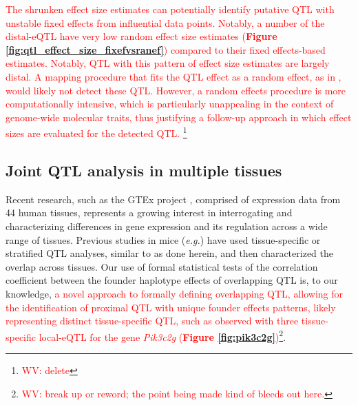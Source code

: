 \documentclass[9pt,twocolumn,twoside]{gsajnl}
\newcommand{\eg}{\emph{e.g.}\xspace}
\newcommand{\WV}[2]{\textcolor{red}{#1\footnote{\textcolor{red}{WV: #2}}}}
\begin{document}
\WV{The shrunken effect size estimates can potentially identify putative QTL with unstable fixed effects from influential data points. Notably, a number of the distal-eQTL have very low random effect size estimates (\textbf{Figure \ref{fig:qtl_effect_size_fixefvsranef}}) compared to their fixed effects-based estimates. Notably, QTL with this pattern of effect size estimates are largely distal. A mapping procedure that fits the QTL effect as a random effect, as in \cite{Wei2016}, would likely not detect these QTL. However, a random effects procedure is more computationally intensive, which is particularly unappealing in the context of genome-wide molecular traits, thus justifying a follow-up approach in which effect sizes are evaluated for the detected QTL.
}{delete}

\subsection{Joint QTL analysis in multiple tissues}

Recent research, such as the GTEx project \citep{GTEX2017}, comprised of expression data from 44 human tissues, represents a growing interest in interrogating and characterizing differences in gene expression and its regulation across a wide range of tissues. Previous studies in mice (\eg \citealt{Huang2009}) have used tissue-specific or stratified QTL analyses, similar to as done herein, and then characterized the overlap across tissues. Our use of formal statistical tests of the correlation coefficient between the founder haplotype effects of overlapping QTL is, to our knowledge, \WV{a novel approach to formally defining overlapping QTL, allowing for the identification of proximal QTL with unique founder effects patterns, likely representing distinct tissue-specific QTL, such as observed with three tissue-specific local-eQTL for the gene \textit{Pik3c2g} (\textbf{Figure \ref{fig:pik3c2g}})}{break up or reword; the point being made kind of bleeds out here.}. 
\end{document}
